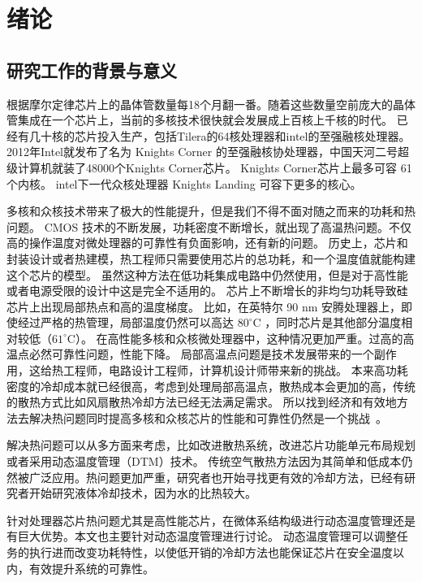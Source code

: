 
\chapter{绪论}
\section{研究工作的背景与意义}\label{sec:mean}
根据摩尔定律芯片上的晶体管数量每18个月翻一番。随着这些数量空前庞大的晶体管集成在一个芯片上，当前的多核技术很快就会发展成上百核上千核的时代\cite{borkar:DAC'07}。
已经有几十核的芯片投入生产，包括Tilera的64核处理器和intel的至强融核处理器。2012年Intel就发布了名为 Knights Corner 的至强融核协处理器，中国天河二号超级计算机就装了48000个Knights Corner芯片。
Knights Corner芯片上最多可容 61个内核。
intel下一代众核处理器 Knights Landing 可容下更多的核心。


多核和众核技术带来了极大的性能提升，但是我们不得不面对随之而来的功耗和热问题。
CMOS 技术的不断发展，功耗密度不断增长，就出现了高温热问题。不仅高的操作温度对微处理器的可靠性有负面影响，还有新的问题。
历史上，芯片和封装设计或者热建模，热工程师只需要使用芯片的总功耗，和一个温度值就能构建这个芯片的模型。
虽然这种方法在低功耗集成电路中仍然使用，但是对于高性能或者电源受限的设计中这是完全不适用的。
芯片上不断增长的非均匀功耗导致硅芯片上出现局部热点和高的温度梯度。
比如，在英特尔 90 nm 安腾处理器上，即使经过严格的热管理，局部温度仍然可以高达 $80 ^\circ$C ，同时芯片是其他部分温度相对较低（$61^\circ$C）\cite{mcgowen2006power}。
在高性能多核和众核微处理器中，这种情况更加严重。过高的高温点必然可靠性问题，性能下降。
局部高温点问题是技术发展带来的一个副作用，这给热工程师，电路设计工程师，计算机设计师带来新的挑战。
本来高功耗密度的冷却成本就已经很高，考虑到处理局部高温点，散热成本会更加的高，传统的散热方式比如风扇散热冷却方法已经无法满足需求。
所以找到经济和有效地方法去解决热问题同时提高多核和众核芯片的性能和可靠性仍然是一个挑战~\cite{Brooks:MICRO'07}。


解决热问题可以从多方面来考虑，比如改进散热系统，改进芯片功能单元布局规划或者采用动态温度管理（DTM）技术。
传统空气散热方法因为其简单和低成本仍然被广泛应用。热问题更加严重，研究者也开始寻找更有效的冷却方法，已经有研究者开始研究液体冷却技术，因为水的比热较大。

针对处理器芯片热问题尤其是高性能芯片，在微体系结构级进行动态温度管理还是有巨大优势。本文也主要针对动态温度管理进行讨论。
动态温度管理可以调整任务的执行进而改变功耗特性，以使低开销的冷却方法也能保证芯片在安全温度以内，有效提升系统的可靠性。


